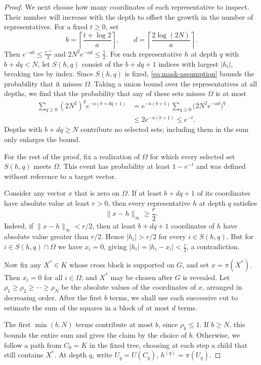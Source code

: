 \documentclass[11pt]{article}
\numberwithin{equation}{section}
\theoremstyle{definition}
\theoremstyle{remark}
\begin{document}
\begin{proof}
We next choose how many coordinates of each representative to inspect.
Their number will increase with the depth to offset the growth in
the number of representatives. For a fixed $t\geq0$, set
\[
 b=\left\lceil\frac{t+\log2}{a}\right\rceil,
 \qquad
 d=\left\lceil\frac{2\log(2N)}a\right\rceil.
\]
Then $e^{-ab}\leq\frac{e^{-t}}2$ and $2N^2e^{-ad}\leq\frac12$.
For each representative $h$ at depth $q$ with $b+dq<N$,
let $S(h,q)$ consist of the $b+dq+1$ indices with largest
$|h_i|$, breaking ties by index. Since $S(h,q)$ is fixed,
\eqref{eq:mask-assumption} bounds the probability that it misses
$\Omega$. Taking a union bound over the representatives at all
depths, we find that the probability that any of these sets misses
$\Omega$ is at most
\[
 \begin{aligned}
 \sum_{q\geq0}(2N^2)^q e^{-a(b+dq+1)}
 &=e^{-a(b+1)}
   \sum_{q\geq0}\bigl(2N^2e^{-ad}\bigr)^q\\
 &\leq2e^{-a(b+1)}
 \leq e^{-t}.
 \end{aligned}
\]
Depths with $b+dq\geq N$ contribute no selected sets;
including them in the sum only enlarges the bound.

For the rest of the proof, fix a realization of $\Omega$ for which
every selected set $S(h,q)$ meets $\Omega$. This event has probability
at least $1-e^{-t}$ and was defined without reference to a target
vector.

Consider any vector $x$ that is zero on $\Omega$. If at least
$b+dq+1$ of its coordinates have absolute value at least $r>0$,
then every representative $h$ at depth $q$ satisfies
\[
 \|x-h\|_\infty\geq\frac r2.
\]
Indeed, if $\|x-h\|_\infty<r/2$, then at least $b+dq+1$
coordinates of $h$ have absolute value greater than $r/2$.
Hence $|h_i|>r/2$ for every $i\in S(h,q)$. But for
$i\in S(h,q)\cap\Omega$ we have $x_i=0$, giving
$|h_i|=|h_i-x_i|<\frac r2$, a contradiction.

Now fix any $X^*\in K$ whose cross block is supported on $G$, and
set $x=\pi(X^*)$. Then $x_i=0$ for all $i\in\Omega$, and $X^*$ may
be chosen after $G$ is revealed. Let
$\rho_1\geq\rho_2\geq\cdots\geq\rho_N$
be the absolute values of the coordinates of $x$, arranged
in decreasing order. After the first $b$ terms, we shall use each
successive cut to estimate the sum of the squares in a block of at
most $d$ terms.

The first $\min(b,N)$ terms contribute at most $b$, since
$\rho_k\leq1$. If $b\geq N$, this bounds the entire sum and gives
the claim by the choice of $b$. Otherwise, we follow a path from
$C_0=K$ in the fixed tree, choosing at each step a child that still
contains $X^*$. At depth $q$, write
$U_q=U(C_q)$, $h^{(q)}=\pi(U_q)$.


\end{proof}
\end{document}
